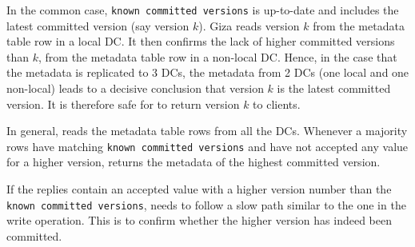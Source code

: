 In the common case, {\tt known committed versions} is up-to-date and
includes the latest committed version (say version $k$).
Giza reads version $k$ from the metadata table row in a local DC.
It then confirms the lack of higher committed versions than $k$,
from the metadata table row in a non-local DC.
Hence, in the case that the metadata is replicated to 3 DCs, 
the metadata from 2 DCs (one local and one non-local) 
leads to a decisive conclusion that version $k$ is the
latest committed version. It is therefore safe for \name to return
version $k$ to clients.

In general, \name reads the metadata table rows from all the DCs.
Whenever a majority rows have matching {\tt known committed versions} and have
not accepted any value for a higher version, \name returns the metadata
of the highest committed version.

If the replies contain an accepted value with a higher version number than the
{\tt known committed versions}, \name needs to follow a slow path
similar to the one in the write operation. This is to confirm whether the higher
version has indeed been committed.



